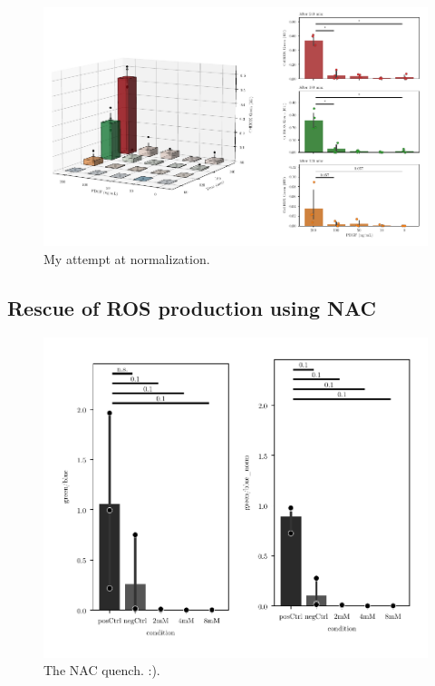     \begin{figure}[htbp]
    \capstart
        \centering
    	\includegraphics{Abbildung/CellROX_titration_norm.pdf}

    	\begin{minipage}{\captionwidth}
    		\caption[cellROX_titration_norm]{ \newline My attempt at normalization.}
    		\label{fig:qPCR}
    	\end{minipage}
    \end{figure}

    \subsection{Rescue of ROS production using NAC}
    \begin{figure}[htbp]
    \capstart
        \centering
    	\includegraphics{Abbildung/NAC_quench.pdf}

    	\begin{minipage}{\captionwidth}
    		\caption[NAC quench]{ \newline The NAC quench. :).}
    		\label{fig:qPCR}
    	\end{minipage}
    \end{figure}

